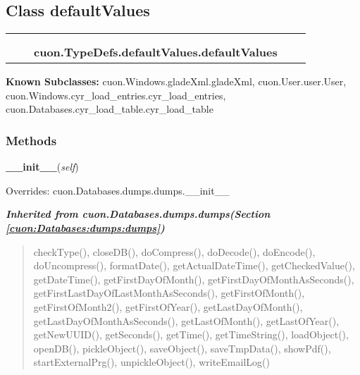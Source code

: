 \subsection{Class defaultValues}

    \label{cuon:TypeDefs:defaultValues:defaultValues}
\begin{tabular}{cccccc}
\multicolumn{2}{r}{\settowidth{\BCL}{cuon.Databases.dumps.dumps}\multirow{2}{\BCL}{cuon.Databases.dumps.dumps}}
&&
  \\\cline{3-3}
  &&\multicolumn{1}{c|}{}
&&
  \\
&&\multicolumn{2}{l}{\textbf{cuon.TypeDefs.defaultValues.defaultValues}}
\end{tabular}

\textbf{Known Subclasses:}
cuon.Windows.gladeXml.gladeXml,
    cuon.User.user.User,
    cuon.Windows.cyr\_load\_entries.cyr\_load\_entries,
    cuon.Databases.cyr\_load\_table.cyr\_load\_table



  \subsubsection{Methods}

    \vspace{0.5ex}

\hspace{.8\funcindent}\begin{boxedminipage}{\funcwidth}

    \raggedright \textbf{\_\_init\_\_}(\textit{self})

\setlength{\parskip}{2ex}
\setlength{\parskip}{1ex}
      Overrides: cuon.Databases.dumps.dumps.\_\_init\_\_

    \end{boxedminipage}


\large{\textbf{\textit{Inherited from cuon.Databases.dumps.dumps\textit{(Section \ref{cuon:Databases:dumps:dumps})}}}}

\begin{quote}
checkType(), closeDB(), doCompress(), doDecode(), doEncode(), doUncompress(), formatDate(), getActualDateTime(), getCheckedValue(), getDateTime(), getFirstDayOfMonth(), getFirstDayOfMonthAsSeconds(), getFirstLastDayOfLastMonthAsSeconds(), getFirstOfMonth(), getFirstOfMonth2(), getFirstOfYear(), getLastDayOfMonth(), getLastDayOfMonthAsSeconds(), getLastOfMonth(), getLastOfYear(), getNewUUID(), getSeconds(), getTime(), getTimeString(), loadObject(), openDB(), pickleObject(), saveObject(), saveTmpData(), showPdf(), startExternalPrg(), unpickleObject(), writeEmailLog()
\end{quote}

